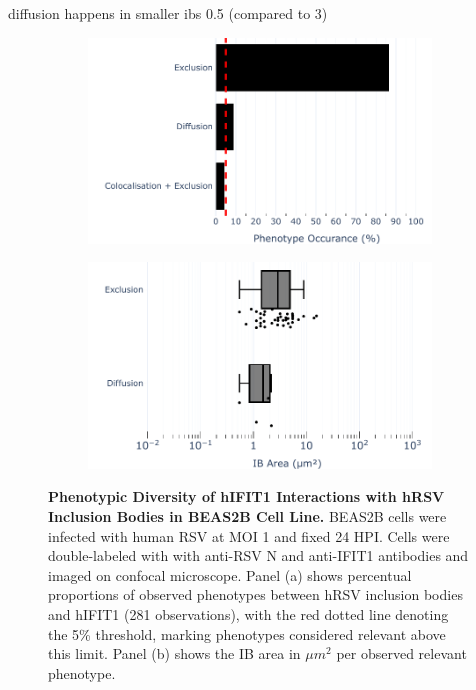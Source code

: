 diffusion happens in smaller ibs 0.5 (compared to 3)

\begin{figure}
    \begin{subfigure}{0.495\textwidth}
        \caption{}
        \includegraphics[width=1\linewidth]{08. Chapter 3/Figs/02. Infection/01. IFIT1/04. bar_i1_beas2b.pdf} 
    \end{subfigure}
    \begin{subfigure}{0.495\textwidth}
        \caption{}
        \includegraphics[width=1\linewidth]{08. Chapter 3/Figs/02. Infection/01. IFIT1/05. box_i1_beas2b.pdf}
    \end{subfigure}
    \caption[Phenotypic Diversity of hIFIT1 Interactions with hRSV Inclusion Bodies in BEAS2B Cell Line.]{\textbf{Phenotypic Diversity of hIFIT1 Interactions with hRSV Inclusion Bodies in BEAS2B Cell Line.} BEAS2B cells were infected with human RSV at MOI 1 and fixed 24 HPI. Cells were double-labeled with with anti-RSV N and anti-IFIT1 antibodies and imaged on confocal microscope. Panel (a) shows percentual proportions of observed phenotypes between hRSV inclusion bodies and hIFIT1 (281 observations), with the red dotted line denoting the 5\% threshold, marking phenotypes considered relevant above this limit. Panel (b) shows the IB area in \(\mu m^2\) per observed relevant phenotype.}
    \label{fig:Phenotypic Diversity of hIFIT1 Interactions with hRSV Inclusion Bodies in BEAS2B Cell Line}
\end{figure}

